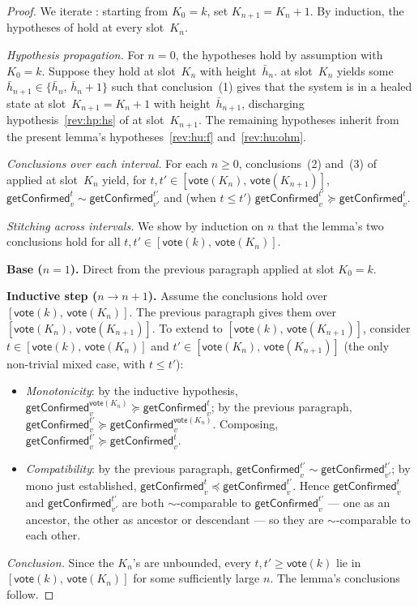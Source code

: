 \ifx\litemode\undefined\documentclass{article}\fi
\newcommand{\vote}{\mathsf{vote}}
\newcommand{\comm}[1]{\bar{#1}}
\newcommand{\getConfirmed}{\textsf{getConfirmed}\xspace}
\theoremstyle{plain}
\theoremstyle{definition}
\theoremstyle{remark}
\begin{document}
\begin{proof}
We iterate : starting from $K_0 = k$, set $K_{n+1} = K_n + 1$. By induction, the hypotheses of  hold at every slot~$K_n$.

\emph{Hypothesis propagation.}
For $n = 0$, the hypotheses hold by assumption with $K_0 = k$. Suppose they hold at slot~$K_n$ with height~$\comm{h}_n$.  at slot~$K_n$ yields some $\comm{h}_{n+1} \in \{\comm{h}_n,\, \comm{h}_n + 1\}$ such that conclusion~(1) gives that the system is in a healed state at slot~$K_{n+1} = K_n + 1$ with height~$\comm{h}_{n+1}$, discharging hypothesis~\ref{rev:hp:hs} of  at slot~$K_{n+1}$. The remaining hypotheses inherit from the present lemma's hypotheses~\ref{rev:hu:f} and~\ref{rev:hu:ohm}.

\emph{Conclusions over each interval.}
For each $n \geq 0$, conclusions~(2) and~(3) of  applied at slot~$K_n$ yield, for $t, t' \in [\vote(K_n),\, \vote(K_{n+1})]$, $\getConfirmed_v^t \sim \getConfirmed_{v'}^{t'}$ and (when $t \leq t'$) $\getConfirmed_v^{t'} \succeq \getConfirmed_v^t$.

\emph{Stitching across intervals.}
We show by induction on $n$ that the lemma's two conclusions hold for all $t, t' \in [\vote(k),\, \vote(K_n)]$.

\textbf{Base ($n = 1$).}
Direct from the previous paragraph applied at slot $K_0 = k$.

\textbf{Inductive step ($n \to n+1$).}
Assume the conclusions hold over $[\vote(k),\, \vote(K_n)]$. The previous paragraph gives them over $[\vote(K_n),\, \vote(K_{n+1})]$. To extend to $[\vote(k),\, \vote(K_{n+1})]$, consider $t \in [\vote(k),\, \vote(K_n)]$ and $t' \in [\vote(K_n),\, \vote(K_{n+1})]$ (the only non-trivial mixed case, with $t \leq t'$):
\begin{itemize}
  \item \emph{Monotonicity}: by the inductive hypothesis, $\getConfirmed_v^{\vote(K_n)} \succeq \getConfirmed_v^t$; by the previous paragraph, $\getConfirmed_v^{t'} \succeq \getConfirmed_v^{\vote(K_n)}$. Composing, $\getConfirmed_v^{t'} \succeq \getConfirmed_v^t$.
  \item \emph{Compatibility}: by the previous paragraph, $\getConfirmed_v^{t'} \sim \getConfirmed_{v'}^{t'}$; by mono just established, $\getConfirmed_v^t \preceq \getConfirmed_v^{t'}$. Hence $\getConfirmed_v^t$ and $\getConfirmed_{v'}^{t'}$ are both $\sim$-comparable to $\getConfirmed_v^{t'}$ — one as an ancestor, the other as ancestor or descendant — so they are $\sim$-comparable to each other.
\end{itemize}

\emph{Conclusion.}
Since the $K_n$'s are unbounded, every $t, t' \geq \vote(k)$ lie in $[\vote(k),\, \vote(K_n)]$ for some sufficiently large $n$. The lemma's conclusions follow.
\end{proof}
\end{document}
